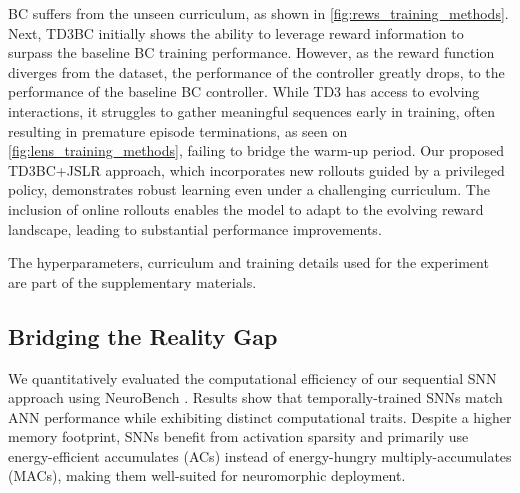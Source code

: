 BC suffers from the unseen curriculum, as shown in \autoref{fig:rews_training_methods}. Next, TD3BC \cite{FujimotoMinimal} initially shows the ability to leverage reward information to surpass the baseline BC training performance. However, as the reward function diverges from the dataset, the performance of the controller greatly drops, to the performance of the baseline BC controller. While TD3 has access to evolving interactions, it struggles to gather meaningful sequences early in training, often resulting in premature episode terminations, as seen on \autoref{fig:lens_training_methods}, failing to bridge the warm-up period. Our proposed TD3BC+JSLR approach, which incorporates new rollouts guided by a privileged policy, demonstrates robust learning even under a challenging curriculum. The inclusion of online rollouts enables the model to adapt to the evolving reward landscape, leading to substantial performance improvements.

The hyperparameters, curriculum and training details used for the experiment are part of the supplementary materials.

\subsection{Bridging the Reality Gap}
We quantitatively evaluated the computational efficiency of our sequential SNN approach using NeuroBench \cite{yik2023neurobench}. Results show that temporally-trained SNNs match ANN performance while exhibiting distinct computational traits. Despite a higher memory footprint, SNNs benefit from activation sparsity and primarily use energy-efficient accumulates (ACs) instead of energy-hungry multiply-accumulates (MACs), making them well-suited for neuromorphic deployment.

